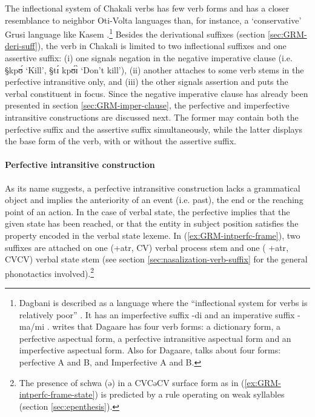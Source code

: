 The inflectional system of Chakali verbs has  few verb
forms and has a closer
resemblance to neighbor Oti-Volta languages than, for instance,  a
`conservative' Grusi language like Kasem \cite[51]{Bonv88}.\footnote{Dagbani is
described as a language where the ``inflectional system  for verbs is relatively
poor''  \cite[96]{Olaw99}. It has an imperfective suffix {\F -di}
\cite[97]{Olaw99} and  an imperative suffix {\F -ma}/{\F mi} \cite[101]{Olaw99}.
\citet[81]{Bodo97} writes that Dagaare has four verb forms: a dictionary
form, a perfective aspectual form, a perfective intransitive aspectual form and
an imperfective aspectual form. Also for Dagaare, \cite{Saan03}  talks about
four forms: perfective A and B, and Imperfective A  and B.}  Besides the
derivational suffixes (section \ref{sec:GRM-deri-suff}), the verb in Chakali is
limited to two
inflectional suffixes and one assertive suffix:  (i) one signals negation in the
negative imperative clause (i.e.  {\S  kpʊ́} `Kill',  {\S tɪ́  kpʊ́ɪ̀} `Don't
kill'),  (ii) another attaches to some verb stems in the perfective intransitive
only, and (iii)  the other signals assertion and puts the verbal constituent in
focus. Since the negative imperative clause has already been presented in
section
\ref{sec:GRM-imper-clause}, the perfective and imperfective intransitive
constructions are discussed next.  The former may contain both the perfective
suffix and the assertive suffix simultaneously, while the latter  displays the
base form of the  verb, with or without the assertive suffix.

\paragraph{Perfective intransitive construction}
\label{sec:GRM-verb-perf-intran}

As its name suggests, a perfective intransitive construction lacks a grammatical
object and implies the anteriority of an event (i.e. past),  the end  or the
reaching point of an action.  In the case of verbal state,
the  perfective  implies that the given state has been reached, or 
that the entity in subject position   satisfies the property encoded in
the verbal state lexeme. In (\ref{ex:GRM-intperfc-frame}),  two suffixes are
attached on  one  ({\sc +atr}, CV) verbal process stem and one  ({\sc
+atr}, CVCV) verbal state stem (see section \ref{sec:nasalization-verb-suffix}
for the general phonotactics involved).\footnote{The presence of schwa
({\F ə}) in a CVCəCV surface form as in (\ref{ex:GRM-intperfc-frame-state})  is
predicted by a rule operating on weak syllables (section \ref{sec:epenthesis}).}


